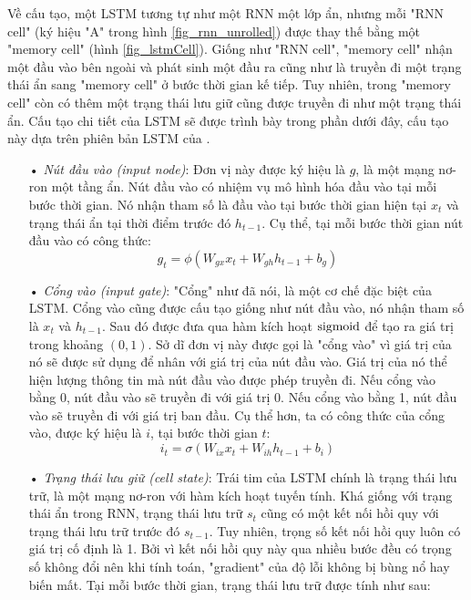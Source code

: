 Về cấu tạo, một LSTM tương tự như một RNN một lớp ẩn, nhưng mỗi "RNN cell" (ký hiệu "A" trong hình \ref{fig_rnn_unrolled}) được thay thế bằng một "memory cell" (hình \ref{fig_lstmCell}). Giống như "RNN cell", "memory cell" nhận một đầu vào bên ngoài và phát sinh một đầu ra cũng như là truyền đi một trạng thái ẩn sang "memory cell" ở bước thời gian kế tiếp. Tuy nhiên, trong "memory cell" còn có thêm một trạng thái lưu giữ cũng được truyền đi như một trạng thái ẩn. Cấu tạo chi tiết của LSTM sẽ được trình bày trong phần dưới đây, cấu tạo này dựa trên phiên bản LSTM của \cite{Gers2000}.

\begin{itemize}
	\item[•] \textit{Nút đầu vào (input node)}: Đơn vị này được ký hiệu là $g$, là một mạng nơ-ron một tầng ẩn. Nút đầu vào có nhiệm vụ mô hình hóa đầu vào tại mỗi bước thời gian. Nó nhận tham số là đầu vào tại bước thời gian hiện tại $x_t$ và trạng thái ẩn tại thời điểm trước đó $h_{t-1}$. Cụ thể, tại mỗi bước thời gian nút đầu vào có công thức:
	\begin{equation} \label{inputNodeLSTM}
		g_t = \phi \left(W_{gx}x_t + W_{gh}h_{t-1} + b_g \right)
	\end{equation}
	\item[•] \textit{Cổng vào (input gate)}: "Cổng" như đã nói, là một cơ chế đặc biệt của LSTM. Cổng vào cũng được cấu tạo giống như nút đầu vào, nó nhận tham số là $x_t$ và $h_{t-1}$. Sau đó được đưa qua hàm kích hoạt $\mathrm{sigmoid}$ để tạo ra giá trị trong khoảng $(0,1)$. Sở dĩ đơn vị này được gọi là "cổng vào" vì giá trị của nó sẽ được sử dụng để nhân với giá trị của nút đầu vào. Giá trị của nó thể hiện lượng thông tin mà nút đầu vào được phép truyền đi. Nếu cổng vào bằng 0, nút đầu vào sẽ truyền đi với giá trị 0. Nếu cổng vào bằng 1, nút đầu vào sẽ truyền đi với giá trị ban đầu. Cụ thể hơn, ta có công thức của cổng vào, được ký hiệu là $i$, tại bước thời gian $t$:
	\begin{equation} \label{inputGateLSTM}
		i_t = \sigma \left(W_{ix}x_t + W_{ih}h_{t-1} + b_i \right)
	\end{equation}
	\item[•] \textit{Trạng thái lưu giữ (cell state)}: Trái tim của LSTM chính là trạng thái lưu trữ, là một mạng nơ-ron với hàm kích hoạt tuyến tính. Khá giống với trạng thái ẩn trong RNN, trạng thái lưu trữ $s_t$ cũng có một kết nối hồi quy với trạng thái lưu trữ trước đó $s_{t-1}$. Tuy nhiên, trọng số kết nối hồi quy luôn có giá trị cố định là 1. Bởi vì kết nối hồi quy này qua nhiều bước đều có trọng số không đổi nên khi tính toán, "gradient" của độ lỗi không bị bùng nổ hay biến mất. Tại mỗi bước thời gian, trạng thái lưu trữ được tính như sau:

\end{itemize}
